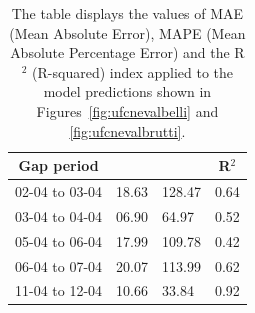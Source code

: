 \begin{table}[H]
	\begin{center}
		\begin{tabular}[c]{l|l|l|l}
			\multicolumn{1}{c|}{\textbf{Gap period}} &
			\makecell{\textbf{MAE} \textbf{(kW)}}    &
			\makecell{\textbf{MAPE} \textbf{(\%)}}   &
			\multicolumn{1}{c}{\textbf{R}$^2$}                               \\
			\hline
			02-04 to 03-04                           & 18.63 & 128.47 & 0.64 \\
			03-04 to 04-04                           & 06.90 & 64.97  & 0.52 \\
			05-04 to 06-04                           & 17.99 & 109.78 & 0.42 \\
			06-04 to 07-04                           & 20.07 & 113.99 & 0.62 \\
			11-04 to 12-04                           & 10.66 & 33.84  & 0.92
		\end{tabular}
	\end{center}
	\caption{The table displays the values of MAE (Mean Absolute Error)\cite{metrics}, MAPE (Mean Absolute Percentage Error)\cite{metrics} and the R$^2$ (R-squared)\cite{metrics} index applied to the model predictions shown in Figures~\ref{fig:ufcnevalbelli} and \ref{fig:ufcnevalbrutti}.}\label{tab:ufcnndatitab1}
\end{table}

